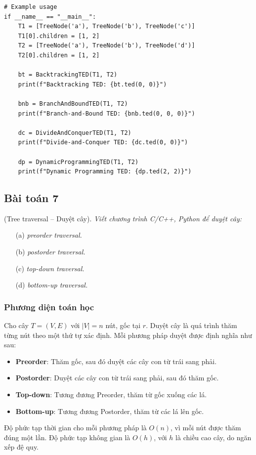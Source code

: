 \documentclass[a4paper,12pt]{article}
\begin{document}
\begin{lstlisting}
# Example usage
if __name__ == "__main__":
    T1 = [TreeNode('a'), TreeNode('b'), TreeNode('c')]
    T1[0].children = [1, 2]
    T2 = [TreeNode('a'), TreeNode('b'), TreeNode('d')]
    T2[0].children = [1, 2]

    bt = BacktrackingTED(T1, T2)
    print(f"Backtracking TED: {bt.ted(0, 0)}")

    bnb = BranchAndBoundTED(T1, T2)
    print(f"Branch-and-Bound TED: {bnb.ted(0, 0, 0)}")

    dc = DivideAndConquerTED(T1, T2)
    print(f"Divide-and-Conquer TED: {dc.ted(0, 0)}")

    dp = DynamicProgrammingTED(T1, T2)
    print(f"Dynamic Programming TED: {dp.ted(2, 2)}")
\end{lstlisting}

\subsection{Bài toán 7} (Tree traversal – Duyệt cây). \textit{Viết chương trình C/C++, Python để duyệt cây:}
\begin{itemize}
    \item[(a)] \textit{preorder traversal.}
    \item[(b)] \textit{postorder traversal.}
    \item[(c)] \textit{top-down traversal.}
    \item[(d)] \textit{bottom-up traversal.}
\end{itemize}

\subsubsection{Phương diện toán học}
Cho cây \( T = (V, E) \) với \( |V| = n \) nút, gốc tại \( r \). Duyệt cây là quá trình thăm từng nút theo một thứ tự xác định. Mỗi phương pháp duyệt được định nghĩa như sau:
\begin{itemize}
    \item \textbf{Preorder}: Thăm gốc, sau đó duyệt các cây con từ trái sang phải.
    \item \textbf{Postorder}: Duyệt các cây con từ trái sang phải, sau đó thăm gốc.
    \item \textbf{Top-down}: Tương đương Preorder, thăm từ gốc xuống các lá.
    \item \textbf{Bottom-up}: Tương đương Postorder, thăm từ các lá lên gốc.
\end{itemize}
Độ phức tạp thời gian cho mỗi phương pháp là \( O(n) \), vì mỗi nút được thăm đúng một lần. Độ phức tạp không gian là \( O(h) \), với \( h \) là chiều cao cây, do ngăn xếp đệ quy.
\end{document}
